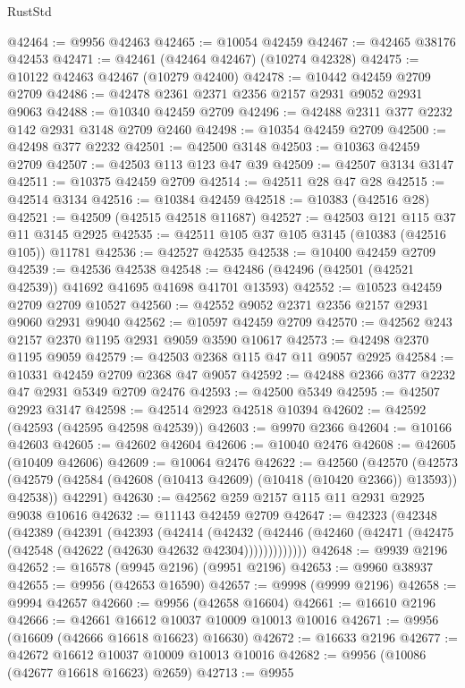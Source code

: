 \begin{lexlean}{RustStd}
\begin{coremodule}
@42464 := @9956 @42463
@42465 := @10054 @42459
@42467 := @42465 @38176 @42453
@42471 := @42461 (@42464 @42467) (@10274 @42328)
@42475 := @10122 @42463 @42467 (@10279 @42400)
@42478 := @10442 @42459 @2709 @2709
@42486 := @42478 @2361 @2371 @2356 @2157 @2931 @9052 @2931 @9063
@42488 := @10340 @42459 @2709
@42496 := @42488 @2311 @377 @2232 @142 @2931 @3148 @2709 @2460
@42498 := @10354 @42459 @2709
@42500 := @42498 @377 @2232
@42501 := @42500 @3148
@42503 := @10363 @42459 @2709
@42507 := @42503 @113 @123 @47 @39
@42509 := @42507 @3134 @3147
@42511 := @10375 @42459 @2709
@42514 := @42511 @28 @47 @28
@42515 := @42514 @3134
@42516 := @10384 @42459
@42518 := @10383 (@42516 @28)
@42521 := @42509 (@42515 @42518 @11687)
@42527 := @42503 @121 @115 @37 @11 @3145 @2925
@42535 := @42511 @105 @37 @105 @3145 (@10383 (@42516 @105)) @11781
@42536 := @42527 @42535
@42538 := @10400 @42459 @2709
@42539 := @42536 @42538
@42548 := @42486 (@42496 (@42501 (@42521 @42539)) @41692 @41695 @41698 @41701 @13593)
@42552 := @10523 @42459 @2709 @2709 @10527
@42560 := @42552 @9052 @2371 @2356 @2157 @2931 @9060 @2931 @9040
@42562 := @10597 @42459 @2709
@42570 := @42562 @243 @2157 @2370 @1195 @2931 @9059 @3590 @10617
@42573 := @42498 @2370 @1195 @9059
@42579 := @42503 @2368 @115 @47 @11 @9057 @2925
@42584 := @10331 @42459 @2709 @2368 @47 @9057
@42592 := @42488 @2366 @377 @2232 @47 @2931 @5349 @2709 @2476
@42593 := @42500 @5349
@42595 := @42507 @2923 @3147
@42598 := @42514 @2923 @42518 @10394
@42602 := @42592 (@42593 (@42595 @42598 @42539))
@42603 := @9970 @2366
@42604 := @10166 @42603
@42605 := @42602 @42604
@42606 := @10040 @2476
@42608 := @42605 (@10409 @42606)
@42609 := @10064 @2476
@42622 := @42560
    (@42570
      (@42573 (@42579 (@42584 (@42608 (@10413 @42609) (@10418 (@10420 @2366)) @13593)) @42538))
      @42291)
@42630 := @42562 @259 @2157 @115 @11 @2931 @2925 @9038 @10616
@42632 := @11143 @42459 @2709
@42647 := @42323
    (@42348
      (@42389
        (@42391
          (@42393
            (@42414
              (@42432
                (@42446 (@42460 (@42471 (@42475 (@42548 (@42622 (@42630 @42632 @42304)))))))))))))
@42648 := @9939 @2196
@42652 := @16578 (@9945 @2196) (@9951 @2196)
@42653 := @9960 @38937
@42655 := @9956 (@42653 @16590)
@42657 := @9998 (@9999 @2196)
@42658 := @9994 @42657
@42660 := @9956 (@42658 @16604)
@42661 := @16610 @2196
@42666 := @42661 @16612 @10037 @10009 @10013 @10016
@42671 := @9956 (@16609 (@42666 @16618 @16623) @16630)
@42672 := @16633 @2196
@42677 := @42672 @16612 @10037 @10009 @10013 @10016
@42682 := @9956 (@10086 (@42677 @16618 @16623) @2659)
@42713 := @9955

\end{coremodule}
\end{lexlean}
